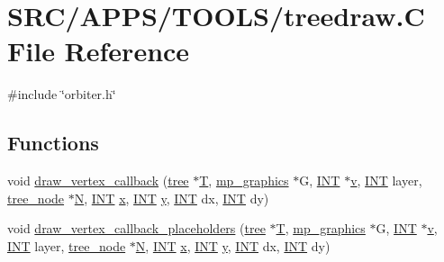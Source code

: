 \hypertarget{treedraw_8_c}{}\section{S\+R\+C/\+A\+P\+P\+S/\+T\+O\+O\+L\+S/treedraw.C File Reference}
\label{treedraw_8_c}
{\ttfamily \#include \char`\"{}orbiter.\+h\char`\"{}}\newline
\subsection*{Functions}
\begin{DoxyCompactItemize}
\item 
void \mbox{\hyperlink{treedraw_8_c_a39cc8da8d250eb22f46a5727b9123396}{draw\+\_\+vertex\+\_\+callback}} (\mbox{\hyperlink{classtree}{tree}} $\ast$\mbox{\hyperlink{pentomino__5x5_8_c_a2b44a927c3e8a68f69f9f943c32c696d}{T}}, \mbox{\hyperlink{classmp__graphics}{mp\+\_\+graphics}} $\ast$G, \mbox{\hyperlink{galois_8h_a09fddde158a3a20bd2dcadb609de11dc}{I\+NT}} $\ast$\mbox{\hyperlink{simeon_8_c_aeb3f3030944801b163bc3b829a7f6710}{v}}, \mbox{\hyperlink{galois_8h_a09fddde158a3a20bd2dcadb609de11dc}{I\+NT}} layer, \mbox{\hyperlink{classtree__node}{tree\+\_\+node}} $\ast$\mbox{\hyperlink{_a_p_p_s_2_t_d_o_2packing_8_c_a0240ac851181b84ac374872dc5434ee4}{N}}, \mbox{\hyperlink{galois_8h_a09fddde158a3a20bd2dcadb609de11dc}{I\+NT}} \mbox{\hyperlink{alphabet2_8_c_a6150e0515f7202e2fb518f7206ed97dc}{x}}, \mbox{\hyperlink{galois_8h_a09fddde158a3a20bd2dcadb609de11dc}{I\+NT}} \mbox{\hyperlink{alphabet2_8_c_a0a2f84ed7838f07779ae24c5a9086d33}{y}}, \mbox{\hyperlink{galois_8h_a09fddde158a3a20bd2dcadb609de11dc}{I\+NT}} dx, \mbox{\hyperlink{galois_8h_a09fddde158a3a20bd2dcadb609de11dc}{I\+NT}} dy)
\item 
void \mbox{\hyperlink{treedraw_8_c_ad34729af2cc5821141def2a0b73e473c}{draw\+\_\+vertex\+\_\+callback\+\_\+placeholders}} (\mbox{\hyperlink{classtree}{tree}} $\ast$\mbox{\hyperlink{pentomino__5x5_8_c_a2b44a927c3e8a68f69f9f943c32c696d}{T}}, \mbox{\hyperlink{classmp__graphics}{mp\+\_\+graphics}} $\ast$G, \mbox{\hyperlink{galois_8h_a09fddde158a3a20bd2dcadb609de11dc}{I\+NT}} $\ast$\mbox{\hyperlink{simeon_8_c_aeb3f3030944801b163bc3b829a7f6710}{v}}, \mbox{\hyperlink{galois_8h_a09fddde158a3a20bd2dcadb609de11dc}{I\+NT}} layer, \mbox{\hyperlink{classtree__node}{tree\+\_\+node}} $\ast$\mbox{\hyperlink{_a_p_p_s_2_t_d_o_2packing_8_c_a0240ac851181b84ac374872dc5434ee4}{N}}, \mbox{\hyperlink{galois_8h_a09fddde158a3a20bd2dcadb609de11dc}{I\+NT}} \mbox{\hyperlink{alphabet2_8_c_a6150e0515f7202e2fb518f7206ed97dc}{x}}, \mbox{\hyperlink{galois_8h_a09fddde158a3a20bd2dcadb609de11dc}{I\+NT}} \mbox{\hyperlink{alphabet2_8_c_a0a2f84ed7838f07779ae24c5a9086d33}{y}}, \mbox{\hyperlink{galois_8h_a09fddde158a3a20bd2dcadb609de11dc}{I\+NT}} dx, \mbox{\hyperlink{galois_8h_a09fddde158a3a20bd2dcadb609de11dc}{I\+NT}} dy)

\end{DoxyCompactItemize}
